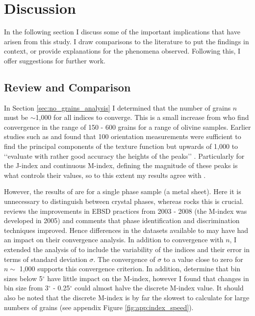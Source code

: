 \documentclass[a4paper,12pt,twoside]{report}
\numberwithin{equation}{chapter}
\begin{document}
\chapter{Discussion} \label{chap:discussion}
\vspace{-1cm}
In the following section I discuss some of the important implications that have arisen from this study. I draw comparisons to the literature to put the findings in context, or provide explanations for the phenomena observed. Following this, I offer suggestions for further work.


\section{Review and Comparison} \label{sec:diss_results_comp}

In Section \ref{sec:no_grains_analysis} I determined that the number of grains $n$ must be $\sim$1,000 for all indices to converge. This is a small increase from \cite{Skemer} who find convergence in the range of 150 - 600 grains for a range of olivine samples. Earlier studies such as \cite{Wright1990} and \cite{Baudin1993} found that 100 orientation measurements were sufficient to find the principal components of the texture function but upwards of 1,000 to \lq\lq{}evaluate with rather good accuracy the heights of the peaks\rq\rq{} \citep{Baudin1993}. Particularly for the J-index and continuous M-index, defining the magnitude of these peaks is what controls their values, so to this extent my results agree with \cite{Baudin1993}. 

However, the results of \cite{Baudin1993} are for a single phase sample (a metal sheet). Here it is unnecessary to distinguish between crystal phases, whereas rocks this is crucial. \cite{Randle2009} reviews the improvements in EBSD practices from 2003 - 2008 (the M-index was developed in 2005) and comments that phase identification and discrimination techniques improved. Hence differences in the datasets available to \cite{Skemer} may have had an impact on their convergence analysis. In addition to convergence with $n$, I extended the analysis of \cite{Skemer} to include the variability of the indices and their error in terms of standard deviation $\sigma$. The convergence of $\sigma$ to a value close to zero for     
$n \sim$ 1,000 supports this convergence criterion. In addition, \cite{Skemer} determine that bin sizes below 5$^\circ$ have little impact on the M-index, however I found that changes in bin size from 3$^\circ$ - 0.25$^\circ$ could almost halve the discrete M-index value. It should also be noted that the discrete M-index is by far the slowest to calculate for large numbers of grains (see appendix Figure \ref{fig:app:index_speed}).
\end{document}
